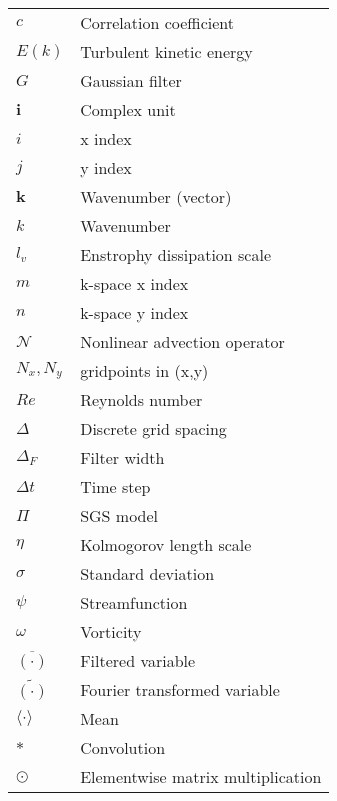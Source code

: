\documentclass[conf]{new-aiaa}
\begin{document}
{\renewcommand\arraystretch{1.0}
\noindent\begin{longtable*}{@{}l @{\quad=\quad} l@{}}
$c$ & Correlation coefficient\\
$E(k)$ & Turbulent kinetic energy\\
$G$ & Gaussian filter \\
$\mathbf{i}$ & Complex unit \\
$i$  & x index \\
$j$  & y index \\
$\mathbf{k}$  & Wavenumber (vector) \\
$k$  & Wavenumber \\
$l_{v}$ & Enstrophy dissipation scale \\
$m$ & k-space x index \\
$n$ & k-space y index \\
$\mathcal{N}$ & Nonlinear advection operator \\
$N_{x},N_{y}$ & gridpoints in (x,y) \\
$Re$ & Reynolds number \\
$\Delta$ & Discrete grid spacing\\
$\Delta_{F}$ & Filter width\\
$\Delta t$ & Time step \\
$\Pi$ & SGS model \\
$\eta$ & Kolmogorov length scale\\
$\sigma$ & Standard deviation \\
$\psi$ & Streamfunction \\
$\omega$ & Vorticity \\
$\overline{(\cdot)}$ & Filtered variable\\
$\tilde{(\cdot)}$ & Fourier transformed variable\\
$\langle \cdot \rangle $ & Mean\\
$\ast $ & Convolution \\
$\odot $ & Elementwise matrix multiplication
\end{longtable*}}
\end{document}
